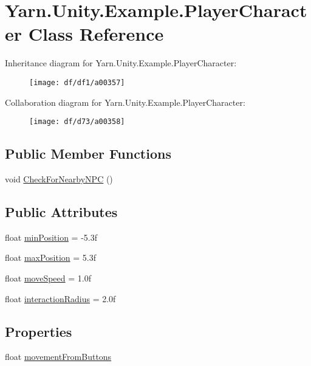 \hypertarget{a00065}{\section{Yarn.\-Unity.\-Example.\-Player\-Character Class Reference}
\label{a00065}
}


Inheritance diagram for Yarn.\-Unity.\-Example.\-Player\-Character\-:
\nopagebreak
\begin{figure}[H]
\begin{center}
\leavevmode
\texttt{[image: df/df1/a00357]}
\end{center}
\end{figure}


Collaboration diagram for Yarn.\-Unity.\-Example.\-Player\-Character\-:
\nopagebreak
\begin{figure}[H]
\begin{center}
\leavevmode
\texttt{[image: df/d73/a00358]}
\end{center}
\end{figure}
\subsection*{Public Member Functions}
\begin{DoxyCompactItemize}
\item 
void \hyperlink{a00065_a574b6d984b8671c7a780d3d10e040a9b}{Check\-For\-Nearby\-N\-P\-C} ()
\end{DoxyCompactItemize}
\subsection*{Public Attributes}
\begin{DoxyCompactItemize}
\item 
float \hyperlink{a00065_ac025d4f4afaf854f8256e0d2d03e5b52}{min\-Position} = -\/5.\-3f
\item 
float \hyperlink{a00065_ada9dd748a1d89a7f9b12ac8967a07ae6}{max\-Position} = 5.\-3f
\item 
float \hyperlink{a00065_adc602a4b2c7e44e4b15a11f1ffcf07e4}{move\-Speed} = 1.\-0f
\item 
float \hyperlink{a00065_af89807d2195915ee9a0c42317e110fc6}{interaction\-Radius} = 2.\-0f
\end{DoxyCompactItemize}
\subsection*{Properties}
\begin{DoxyCompactItemize}
\item 
float \hyperlink{a00065_a7bcde19f080bfd09bbc833b8fb555cf7}{movement\-From\-Buttons}
\end{DoxyCompactItemize}
